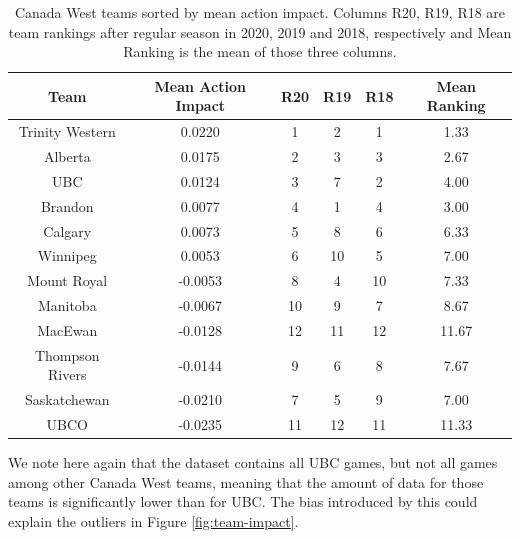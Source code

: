 \documentclass{sfuthesis}
\begin{document}
	\begin{table}[ht]
		\centering
		\begin{tabular}{cccccc}
			\textbf{Team}   & \textbf{Mean Action Impact} & \textbf{R20} & \textbf{R19} & \textbf{R18} & \textbf{Mean Ranking} \\ \hline
			Trinity Western & 0.0220                      & 1            & 2            & 1            & 1.33                  \\
			Alberta         & 0.0175                      & 2            & 3            & 3            & 2.67                  \\
			UBC             & 0.0124                      & 3            & 7            & 2            & 4.00                  \\
			Brandon         & 0.0077                      & 4            & 1            & 4            & 3.00                  \\
			Calgary         & 0.0073                      & 5            & 8            & 6            & 6.33                  \\
			Winnipeg        & 0.0053                      & 6            & 10           & 5            & 7.00                  \\
			Mount Royal     & -0.0053                     & 8            & 4            & 10           & 7.33                  \\
			Manitoba        & -0.0067                     & 10           & 9            & 7            & 8.67                  \\
			MacEwan         & -0.0128                     & 12           & 11           & 12           & 11.67                 \\
			Thompson Rivers & -0.0144                     & 9            & 6            & 8            & 7.67                  \\
			Saskatchewan    & -0.0210                     & 7            & 5            & 9            & 7.00                  \\
			UBCO            & -0.0235                     & 11           & 12           & 11           & 11.33                
		\end{tabular}
		\caption{Canada West teams sorted by mean action impact. Columns R20, R19, R18 are team rankings after regular season in 2020, 2019 and 2018, respectively and Mean Ranking is the mean of those three columns.}
		\label{tab:team-impact}
	\end{table}
	
	We note here again that the dataset contains all UBC games, but not all games among other Canada West teams, meaning that the amount of data for those teams is significantly lower than for UBC. The bias introduced by this could explain the outliers in Figure \ref{fig:team-impact}.
	
\end{document}
